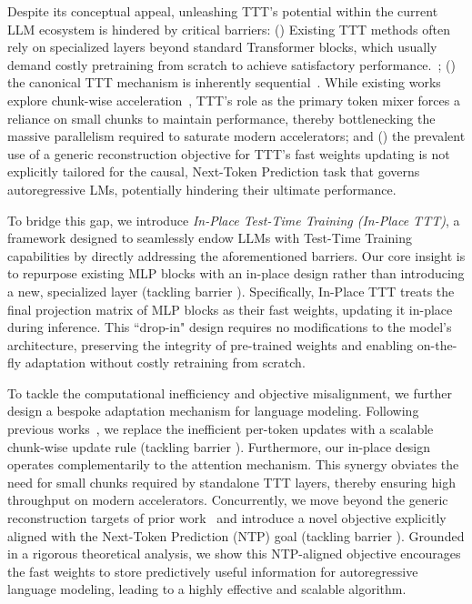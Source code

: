 Despite its conceptual appeal, unleashing TTT's potential within the current LLM ecosystem is hindered by critical barriers: \textcolor{myblue}{()} Existing TTT methods often rely on specialized layers beyond standard Transformer blocks, which usually demand costly pretraining from scratch to achieve satisfactory performance.~\citep{sun2020ttt,wang2021tent,zhang2025tttdr,sun2024tttLayers}; \textcolor{myblue}{()} the canonical TTT mechanism is inherently sequential~\citep{sun2020ttt,sun2024tttLayers}. While existing works explore chunk-wise acceleration~\citep{sun2023retentive,behrouz2024titans,irie2025fastweightprogramminglinear,yau2025sequentialparalleldualityprefixscannable}, TTT's role as the primary token mixer forces a reliance on small chunks to maintain performance, thereby bottlenecking the massive parallelism required to saturate modern accelerators; and \textcolor{myblue}{()} the prevalent use of a generic reconstruction objective for TTT's fast weights updating is not explicitly tailored for the causal, Next-Token Prediction task that governs autoregressive LMs, potentially hindering their ultimate performance.

To bridge this gap, we introduce \textit{In-Place Test-Time Training (In-Place TTT)}, a framework designed to seamlessly endow LLMs with Test-Time Training capabilities by directly addressing the aforementioned barriers. Our core insight is to repurpose existing MLP blocks with an in-place design rather than introducing a new, specialized layer \textcolor{myblue}{(tackling barrier )}. Specifically, In-Place TTT treats the final projection matrix of MLP blocks as their fast weights, updating it in-place during inference. This ``drop-in" design requires no modifications to the model's architecture, preserving the integrity of pre-trained weights and enabling on-the-fly adaptation without costly retraining from scratch.

To tackle the computational inefficiency and objective misalignment, we further design a bespoke adaptation mechanism for language modeling. Following previous works~\citep{sun2023retentive,behrouz2024titans,irie2025fastweightprogramminglinear,zhang2025tttdr,yau2025sequentialparalleldualityprefixscannable}, we replace the inefficient per-token updates with a scalable chunk-wise update rule \textcolor{myblue}{(tackling barrier )}. Furthermore, our in-place design operates complementarily to the attention mechanism. This synergy obviates the need for small chunks required by standalone TTT layers, thereby ensuring high throughput on modern accelerators. Concurrently, we move beyond the generic reconstruction targets of prior work~\citep{sun2024tttLayers,zhang2025tttdr} and introduce a novel objective explicitly aligned with the Next-Token Prediction (NTP) goal \textcolor{myblue}{(tackling barrier )}. Grounded in a rigorous theoretical analysis, we show this NTP-aligned objective encourages the fast weights to store predictively useful information for autoregressive language modeling, leading to a highly effective and scalable algorithm.

